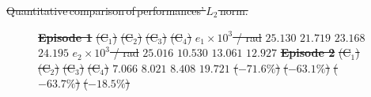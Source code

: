 \documentclass[letterpaper, journal]{IEEEtran}
\providecommand{\DIFdel}[1]{{\protect\color{red}\sout{#1}}} %
\providecommand{\DIFdelFL}[1]{\DIFdel{#1}} %
\providecommand{\DIFaddbeginFL}{} %
\providecommand{\DIFaddendFL}{} %
\providecommand{\DIFdelbeginFL}{} %
\providecommand{\DIFdelendFL}{} %
\begin{document}
{%
\DIFdelFL{Quantitative\,comparison\,of\,performances'\,$L_2$\,norm.}}
\DIFdelendFL \DIFaddbeginFL \begin{figure}[t]
  \DIFaddendFL \centering
  \DIFdelbeginFL %
{%
\textbf{\DIFdelFL{Episode 1}}%
} %
\DIFdelFL{(C$_1$) }%
\DIFdelFL{(C$_2$) }%
\DIFdelFL{(C$_3$) }%
\DIFdelFL{(C$_4$) }%
\DIFdelFL{$e_1\times10^{3}$ / rad }%
\DIFdelFL{$25.130$ }%
\DIFdelFL{$21.719$ }%
\DIFdelFL{$23.168$ }%
\DIFdelFL{$24.195$ }%
\DIFdelFL{$e_2\times10^{3}$ / rad }%
\DIFdelFL{$25.016$ }%
\DIFdelFL{$10.530$ }%
\DIFdelFL{$13.061$ }%
\DIFdelFL{$12.927$ }%
{%
\textbf{\DIFdelFL{Episode 2}}%
} %
\DIFdelFL{(C$_1$) }%
\DIFdelFL{(C$_2$) }%
\DIFdelFL{(C$_3$) }%
\DIFdelFL{(C$_4$) }%
\DIFdelFL{$7.066$ }%
\DIFdelFL{$8.021$ }%
\DIFdelFL{$8.408$ }%
\DIFdelFL{$19.721$ }%
\DIFdelFL{($-71.6\%$) }%
\DIFdelFL{($-63.1\%$) }%
\DIFdelFL{($-63.7\%$) }%
\DIFdelFL{($-18.5\%$) }%

\end{figure}
\end{document}
